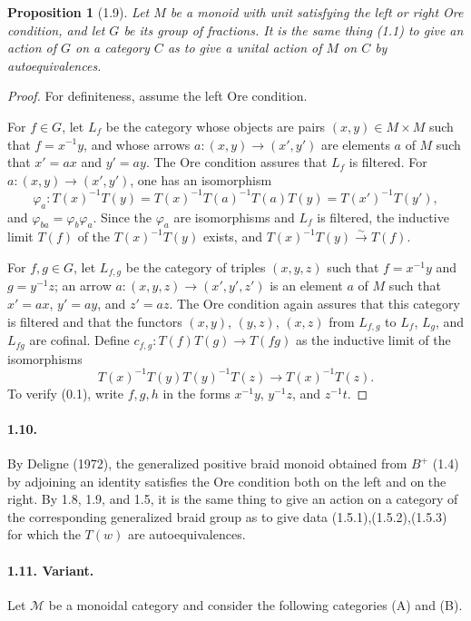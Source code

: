 \documentclass[11pt]{article}
\newcommand{\calM}{\mathcal M}
\newtheorem{proposition}[theorem]{Proposition}
\begin{document}
\begin{proposition}[1.9]
Let $M$ be a monoid with unit satisfying the left or right Ore condition, and let $G$ be its group of fractions. It is the same thing (1.1) to give an action of $G$ on a category $C$ as to give a unital action of $M$ on $C$ by autoequivalences.
\end{proposition}
\begin{proof}
For definiteness, assume the left Ore condition.

For $f\in G$, let $L_f$ be the category whose objects are pairs $(x,y)\in M\times M$ such that $f=x^{-1}y$, and whose arrows $a:(x,y)\to(x',y')$ are elements $a$ of $M$ such that $x'=ax$ and $y'=ay$. The Ore condition assures that $L_f$ is filtered. For $a:(x,y)\to(x',y')$, one has an isomorphism
\[
 \varphi_a:T(x)^{-1}T(y)=T(x)^{-1}T(a)^{-1}T(a)T(y)=T(x')^{-1}T(y'),
\]
and $\varphi_{ba}=\varphi_b\varphi_a$. Since the $\varphi_a$ are isomorphisms and $L_f$ is filtered, the inductive limit $T(f)$ of the $T(x)^{-1}T(y)$ exists, and $T(x)^{-1}T(y)\xrightarrow{\sim}T(f)$.

For $f,g\in G$, let $L_{f,g}$ be the category of triples $(x,y,z)$ such that $f=x^{-1}y$ and $g=y^{-1}z$; an arrow $a:(x,y,z)\to(x',y',z')$ is an element $a$ of $M$ such that $x'=ax$, $y'=ay$, and $z'=az$. The Ore condition again assures that this category is filtered and that the functors $(x,y)$, $(y,z)$, $(x,z)$ from $L_{f,g}$ to $L_f$, $L_g$, and $L_{fg}$ are cofinal. Define $c_{f,g}:T(f)T(g)\to T(fg)$ as the inductive limit of the isomorphisms
\[
 T(x)^{-1}T(y)T(y)^{-1}T(z)\longrightarrow T(x)^{-1}T(z).
\]
To verify (0.1), write $f,g,h$ in the forms $x^{-1}y$, $y^{-1}z$, and $z^{-1}t$.
\end{proof}

\paragraph{1.10.} By Deligne (1972), the generalized positive braid monoid obtained from $B^+$ (1.4) by adjoining an identity satisfies the Ore condition both on the left and on the right. By 1.8, 1.9, and 1.5, it is the same thing to give an action on a category of the corresponding generalized braid group as to give data (1.5.1),(1.5.2),(1.5.3) for which the $T(w)$ are autoequivalences.

\paragraph{1.11. Variant.} Let $\calM$ be a monoidal category and consider the following categories (A) and (B).
\end{document}
